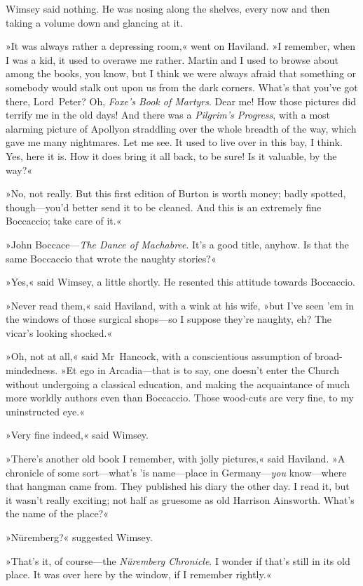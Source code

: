 Wimsey said nothing. He was nosing along the shelves, every now and then taking a volume down and glancing at it.

»It was always rather a depressing room,« went on Haviland. »I remember, when I was a kid, it used to overawe me rather. Martin and I used to browse about among the books, you know, but I think we were always afraid that something or somebody would stalk out upon us from the dark corners. What's that you've got there, Lord~Peter? Oh, \textit{Foxe's Book of Martyrs}. Dear me! How those pictures did terrify me in the old days! And there was a \textit{Pilgrim's Progress}, with a most alarming picture of Apollyon straddling over the whole breadth of the way, which gave me many nightmares. Let me see. It used to live over in this bay, I think. Yes, here it is. How it does bring it all back, to be sure! Is it valuable, by the way?«

»No, not really. But this first edition of Burton is worth money; badly spotted, though—you'd better send it to be cleaned. And this is an extremely fine Boccaccio; take care of it.«

»John Boccace—\textit{The Dance of Machabree}. It's a good title, anyhow. Is that the same Boccaccio that wrote the naughty stories?«

»Yes,« said Wimsey, a little shortly. He resented this attitude towards Boccaccio.

»Never read them,« said Haviland, with a wink at his wife, »but I've seen 'em in the windows of those surgical shops—so I suppose they're naughty, eh? The vicar's looking shocked.«

»Oh, not at all,« said Mr~Hancock, with a conscientious assumption of broad-mindedness. »Et ego in Arcadia—that is to say, one doesn't enter the Church without undergoing a classical education, and making the acquaintance of much more worldly authors even than Boccaccio. Those wood-cuts are very fine, to my uninstructed eye.«

»Very fine indeed,« said Wimsey.

»There's another old book I remember, with jolly pictures,« said Haviland. »A chronicle of some sort—what's 'is name—place in Germany—\textit{you} know—where that hangman came from. They published his diary the other day. I read it, but it wasn't really exciting; not half as gruesome as old Harrison Ainsworth. What's the name of the place?«

»Nüremberg?« suggested Wimsey.

»That's it, of course—the \textit{Nüremberg \textit{Chronicle}}. I wonder if that's still in its old place. It was over here by the window, if I remember rightly.«

